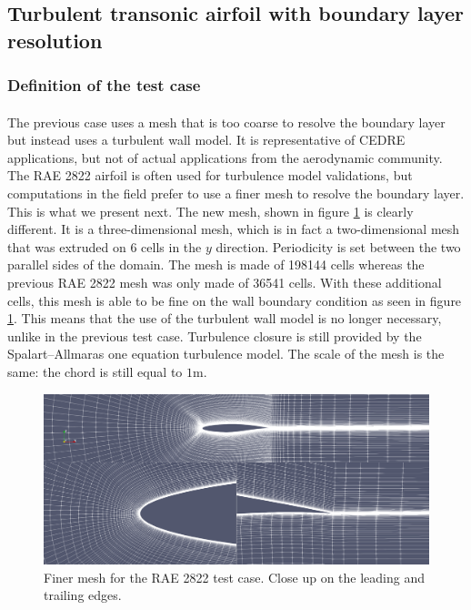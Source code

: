     \pagebreak
    \subsection{Turbulent transonic airfoil with boundary layer resolution}

      \subsubsection{Definition of the test case}

        \paragraph{}
        The previous case uses a mesh that is too coarse to resolve the boundary layer but instead uses a turbulent wall model.
        It is representative of CEDRE applications, but not of actual applications from the aerodynamic community.
        The RAE 2822 airfoil is often used for turbulence model validations, but computations in the field prefer to use a finer mesh to resolve the boundary layer.
        This is what we present next.
        The new mesh, shown in figure \ref{fig:rae_mesh_fine} is clearly different.
        It is a three-dimensional mesh, which is in fact a two-dimensional mesh that was extruded on 6 cells in the $y$ direction.
        Periodicity is set between the two parallel sides of the domain.
        The mesh is made of \num{198144} cells whereas the previous RAE 2822 mesh was only made of \num{36541} cells.
        With these additional cells, this mesh is able to be fine on the wall boundary condition as seen in figure \ref{fig:rae_mesh_fine}.
        This means that the use of the turbulent wall model is no longer necessary, unlike in the previous test case.
        Turbulence closure is still provided by the Spalart--Allmaras one equation turbulence model.
        The scale of the mesh is the same: the chord is still equal to $1\si{\meter}$.

        \begin{figure}
          \centering
          \includegraphics[width=\textwidth]{figures/rae_mesh_fine.png}
          \caption{Finer mesh for the RAE 2822 test case. Close up on the leading and trailing edges.}
          \label{fig:rae_mesh_fine}
        \end{figure}

